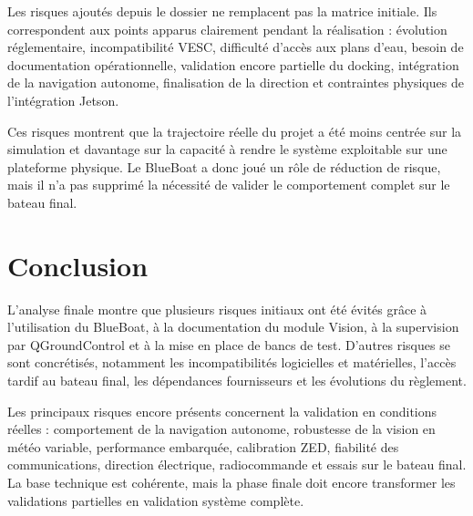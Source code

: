 \documentclass[11pt,letterpaper]{article}
\begin{document}
Les risques ajoutés depuis le dossier ne remplacent pas la matrice initiale. Ils correspondent aux points apparus clairement pendant la réalisation : évolution réglementaire, incompatibilité VESC, difficulté d'accès aux plans d'eau, besoin de documentation opérationnelle, validation encore partielle du docking, intégration de la navigation autonome, finalisation de la direction et contraintes physiques de l'intégration Jetson.

Ces risques montrent que la trajectoire réelle du projet a été moins centrée sur la simulation et davantage sur la capacité à rendre le système exploitable sur une plateforme physique. Le BlueBoat a donc joué un rôle de réduction de risque, mais il n'a pas supprimé la nécessité de valider le comportement complet sur le bateau final.

\section{Conclusion}

L'analyse finale montre que plusieurs risques initiaux ont été évités grâce à l'utilisation du BlueBoat, à la documentation du module Vision, à la supervision par QGroundControl et à la mise en place de bancs de test. D'autres risques se sont concrétisés, notamment les incompatibilités logicielles et matérielles, l'accès tardif au bateau final, les dépendances fournisseurs et les évolutions du règlement.

Les principaux risques encore présents concernent la validation en conditions réelles : comportement de la navigation autonome, robustesse de la vision en météo variable, performance embarquée, calibration ZED, fiabilité des communications, direction électrique, radiocommande et essais sur le bateau final. La base technique est cohérente, mais la phase finale doit encore transformer les validations partielles en validation système complète.
\end{document}
